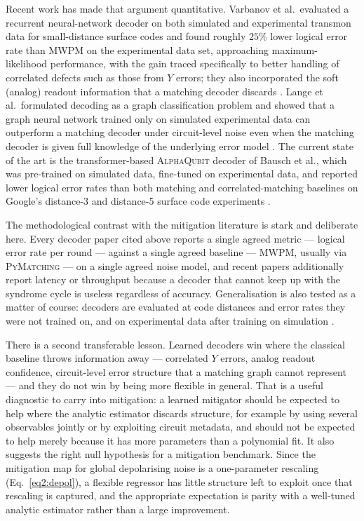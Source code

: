 \documentclass[Thesis.tex]{subfiles}
\begin{document}
Recent work has made that argument quantitative. Varbanov et al.\ evaluated a
recurrent neural-network decoder on both simulated and experimental transmon
data for small-distance surface codes and found roughly $25\%$ lower logical
error rate than MWPM on the experimental data set, approaching
maximum-likelihood performance, with the gain traced specifically to better
handling of correlated defects such as those from $Y$ errors; they also
incorporated the soft (analog) readout information that a matching decoder
discards \cite{varbanov2025neural}. Lange et al.\ formulated decoding as a
graph classification problem and showed that a graph neural network trained
only on simulated experimental data can outperform a matching decoder under
circuit-level noise even when the matching decoder is given full knowledge of
the underlying error model \cite{lange2025data}. The current state of the art
is the transformer-based \textsc{AlphaQubit} decoder of Bausch et al., which
was pre-trained on simulated data, fine-tuned on experimental data, and
reported lower logical error rates than both matching and correlated-matching
baselines on Google's distance-3 and distance-5 surface code experiments
\cite{bausch2024learning}.

The methodological contrast with the mitigation literature is stark and
deliberate here. Every decoder paper cited above reports a single agreed
metric --- logical error rate per round --- against a single agreed baseline
--- MWPM, usually via \textsc{PyMatching} --- on a single agreed noise model,
and recent papers additionally report latency or throughput because a decoder
that cannot keep up with the syndrome cycle is useless regardless of accuracy.
Generalisation is also tested as a matter of course: decoders are evaluated at
code distances and error rates they were not trained on, and on experimental
data after training on simulation
\cite{varbanov2025neural,lange2025data,bausch2024learning}.

There is a second transferable lesson. Learned decoders win where the
classical baseline throws information away --- correlated $Y$ errors, analog
readout confidence, circuit-level error structure that a matching graph cannot
represent \cite{varbanov2025neural,lange2025data} --- and they do not win by
being more flexible in general. That is a useful diagnostic to carry into
mitigation: a learned mitigator should be expected to help where the analytic
estimator discards structure, for example by using several observables jointly
or by exploiting circuit metadata, and should not be expected to help merely
because it has more parameters than a polynomial fit. It also suggests the
right null hypothesis for a mitigation benchmark. Since the mitigation map for
global depolarising noise is a one-parameter rescaling
(Eq.~\eqref{eq2:depol}), a flexible regressor has little structure left to
exploit once that rescaling is captured, and the appropriate expectation is
parity with a well-tuned analytic estimator rather than a large improvement.
\end{document}
